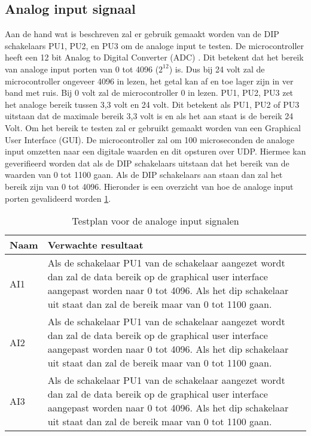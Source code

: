 \subsection{Analog input signaal}
Aan de hand wat is beschreven zal er gebruik gemaakt worden van de DIP schakelaars PU1, PU2, en PU3 om de analoge input te testen. De microcontroller heeft een 12 bit Analog to Digital Converter (ADC) \autocite{microcontroller}. Dit betekent dat het bereik van analoge input porten van 0 tot 4096 ($2^{12}$) is. Dus bij 24 volt zal de microcontroller ongeveer 4096 in lezen, het getal kan af en toe lager zijn in ver band met ruis. Bij 0 volt zal de microcontroller 0 in lezen. PU1, PU2, PU3 zet het analoge bereik tussen 3,3 volt en 24 volt. Dit betekent als PU1, PU2 of PU3 uitstaan dat de maximale bereik 3,3 volt is en als het aan staat is de bereik 24 Volt. Om het bereik te testen zal er gebruikt gemaakt worden van een Graphical User Interface (GUI). De microcontroller zal om 100 microseconden de analoge input omzetten naar een digitale waarden en dit opsturen over UDP. Hiermee kan geverifieerd worden dat als de DIP schakelaars uitstaan dat het bereik van de waarden van 0 tot 1100 gaan. Als de DIP schakelaars aan staan dan zal het bereik zijn van 0 tot 4096. Hieronder is een overzicht van hoe de analoge input porten gevalideerd worden \ref{tab:hw_val_ai_testplan}.
\begin{table}[h!]
	\caption{Testplan voor de analoge input signalen}
	\begin{tabular}{lp{14.5cm}}
	\toprule
	\textbf{Naam} 	& \textbf{Verwachte resultaat} \\ \toprule
	AI1			& Als de schakelaar PU1 van de schakelaar aangezet wordt dan zal de data bereik op de graphical user interface aangepast worden naar 0 tot 4096. Als het dip schakelaar uit staat dan zal de bereik maar van 0 tot 1100 gaan.\\
	AI2			& Als de schakelaar PU1 van de schakelaar aangezet wordt dan zal de data bereik op de graphical user interface aangepast worden naar 0 tot 4096. Als het dip schakelaar uit staat dan zal de bereik maar van 0 tot 1100 gaan.\\
	AI3			& Als de schakelaar PU1 van de schakelaar aangezet wordt dan zal de data bereik op de graphical user interface aangepast worden naar 0 tot 4096. Als het dip schakelaar uit staat dan zal de bereik maar van 0 tot 1100 gaan.\\  \bottomrule
	\end{tabular}
	\label{tab:hw_val_ai_testplan}
\end{table}

